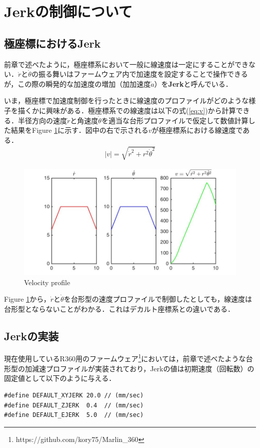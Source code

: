 \documentclass[twocolumn,oneside,a4paper]{article}
\begin{document}
\section{Jerkの制御について}
\subsection{極座標におけるJerk}
前章で述べたように，極座標系において一般に線速度は一定にすることができない．$\dot{r}$と$\dot{\theta}$の振る舞いはファームウェア内で加速度を設定することで操作できるが，この際の瞬発的な加速度の増加（加加速度$\dot{a}$）を{\bf Jerk}と呼んでいる．

いま，極座標で加速度制御を行ったときに線速度のプロファイルがどのような様子を描くかに興味がある．極座標系での線速度は以下の式(\ref{eq:v})から計算できる．半径方向の速度$\dot{r}$と角速度$\dot{\theta}$を適当な台形プロファイルで仮定して数値計算した結果をFigure \ref{fig:jerk}に示す．図中の右で示される$v$が極座標系における線速度である．
\begin{eqnarray}\label{eq:v}
	|v| = \sqrt{ \dot{r}^2+ r^2 \dot{\theta}^2 } 
\end{eqnarray}

\begin{figure}[htbp]
    \includegraphics[bb=0 0 432 216,width=1\columnwidth]{accel2.pdf}
    \caption{Velocity profile}
    \label{fig:jerk}
\end{figure}

Figure \ref{fig:jerk}から，$\dot{r}$と$\dot{\theta}$を台形型の速度プロファイルで制御したとしても，線速度は台形型とならないことがわかる．これはデカルト座標系との違いである．

\subsection{Jerkの実装}
現在使用しているR360用のファームウェア\footnote{https://github.com/kory75/Marlin\_360}においては，前章で述べたような台形型の加減速プロファイルが実装されており，Jerkの値は初期速度（回転数）の固定値として以下のように与える．
{\small
\begin{verbatim}
#define DEFAULT_XYJERK 20.0 // (mm/sec)
#define DEFAULT_ZJERK  0.4  // (mm/sec)
#define DEFAULT_EJERK  5.0  // (mm/sec)
\end{verbatim}}
\end{document}
